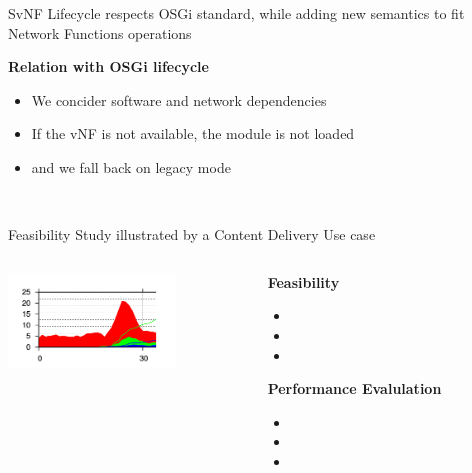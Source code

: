 \documentclass[a4paper]{beamer}
\begin{document}
\begin{frame}{SvNF Lifecycle respects OSGi standard, while adding new semantics to fit Network Functions operations}
	\begin{flushleft}	
		\textbf{Relation with OSGi lifecycle}
		\begin{itemize}
			\item We concider software and network dependencies
			\item If the vNF is not available, the module is not loaded
			\item and we fall back on legacy mode
		\end{itemize}
	\end{flushleft}
	\vspace{2em}
	\centering
	\\
\end{frame}


\begin{frame}{Feasibility Study illustrated by a Content Delivery Use case}
	\begin{columns}[T]
		\begin{column}[T]{0.33 \textwidth} 
			\vspace{1cm}
			\includegraphics[width=12em]{results.png}
		\end{column}
										
		\begin{column}[T]{0.66\textwidth} 
										   
			\textbf{Feasibility}
			\begin{itemize}
				\item  
				\item 
				\item 
			\end{itemize}
			\vspace{3mm}
			\textbf{Performance Evalulation}
			\begin{itemize}
				\item 
				\item 
				\item 
			\end{itemize}
		\end{column}
																										
	\end{columns}
								
\end{frame}
\end{document}
